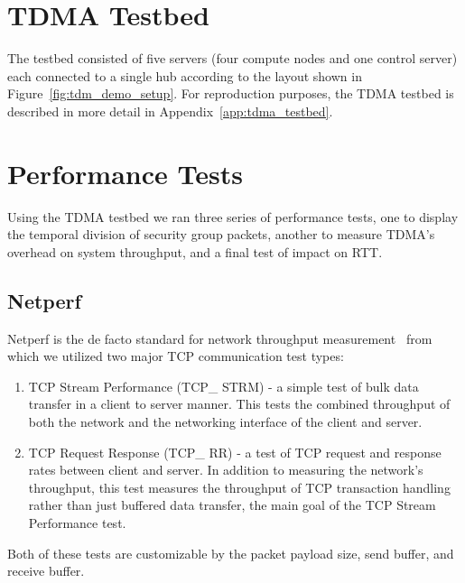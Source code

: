 \documentclass[oneside,12pt]{memoir}
\begin{document}
\section{TDMA Testbed}
The testbed consisted of five servers (four compute nodes and one control server) each connected to a single hub according to the layout shown in Figure~\ref{fig:tdm_demo_setup}. For reproduction purposes, the TDMA testbed is described in more detail in Appendix~\ref{app:tdma_testbed}. 

\section{Performance Tests}
Using the TDMA testbed we ran three series of performance tests, one to display the temporal division of security group packets, another to measure TDMA's overhead on system throughput, and a final test of impact on RTT.
\subsection{Netperf}
Netperf is the de facto standard for network throughput measurement~\cite{king2000parallel}\cite{blum2003network}\cite{kolahi2008impact}\cite{zhang2010evaluating} from which we utilized two major TCP communication test types:
\begin{enumerate}
\item TCP Stream Performance (TCP\_ STRM) - a simple test of bulk data transfer in a client to server manner. This tests the combined throughput of both the network and the networking interface of the client and server. 
\item TCP Request Response (TCP\_ RR) - a test of TCP request and response rates between client and server. In addition to measuring the network's throughput, this test measures the throughput of TCP transaction handling rather than just buffered data transfer, the main goal of the TCP Stream Performance test.
\end{enumerate}
Both of these tests are customizable by the packet payload size, send buffer, and receive buffer.
\end{document}
